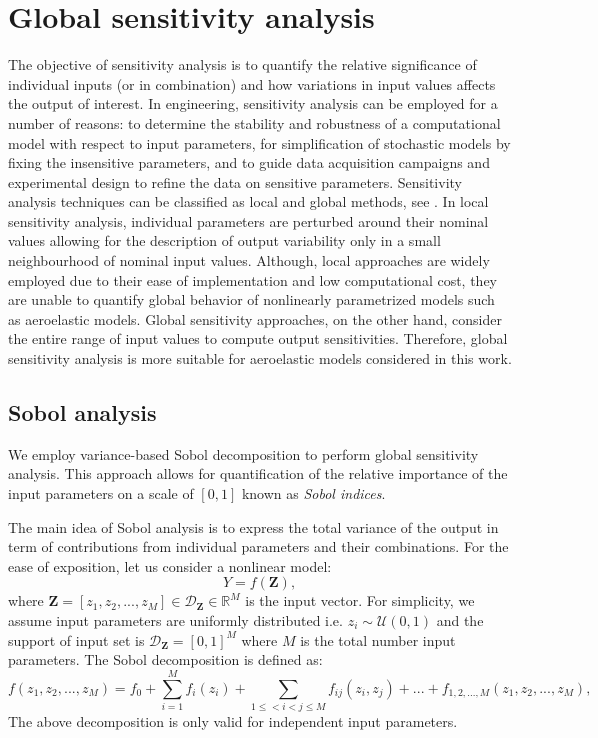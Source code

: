 \documentclass[review]{elsarticle}
\numberwithin{equation}{section}
\numberwithin{equation}{section}
\begin{document}
\section{Global sensitivity analysis}\label{sec:GSA}
The objective of sensitivity analysis is to quantify the relative significance of individual inputs (or in combination) and how variations in input values affects the output of interest. In engineering, sensitivity analysis can be employed for a number of reasons: to determine the stability and robustness of a computational model with respect to input parameters, for simplification of stochastic models by fixing the insensitive parameters, and to guide data acquisition campaigns and experimental design to refine the data on sensitive parameters. Sensitivity analysis techniques can be classified as local and global methods, see \cite{RSmith}. In local sensitivity analysis, individual parameters are perturbed around their nominal values allowing for the description of output variability only in a small neighbourhood of nominal input values. Although, local approaches are widely employed due to their ease of implementation and low computational cost, they are unable to quantify global behavior of nonlinearly parametrized models such as aeroelastic models. Global sensitivity approaches, on the other hand, consider the entire range of input values to compute output sensitivities. Therefore, global sensitivity analysis is more suitable for aeroelastic models considered in this work.  

\subsection{Sobol analysis}
We employ variance-based Sobol decomposition to perform global sensitivity analysis. This approach allows for quantification of  the relative importance of the input parameters on a scale of $[0,1]$ known as \emph{Sobol indices}. 

The main idea of Sobol analysis is to express the total variance of the output in term of contributions from individual parameters and their combinations. For the ease of exposition, let us consider a nonlinear model:
\begin{equation}\label{nonlinear_model}
Y = f(\mathbf{Z}),
\end{equation}
where $\mathbf{Z} = [z_1, z_2, ..., z_M]\in \mathcal{D}_{\mathbf{Z}}\in \mathbb{R}^M$ is the input vector. For simplicity, we assume input parameters are uniformly distributed i.e. $z_i \sim \mathcal{U}(0,1)$ and the support of input set is $\mathcal{D}_\mathbf{Z}  =  [0,1]^M$ where $M$ is the total number input parameters. The Sobol decomposition is defined as:
\begin{equation}\label{sobol_decomp}
f(z_1, z_2, ..., z_M) = f_0+\sum_{i=1}^M f_i(z_i) + \sum_{1\leq<i<j\leq M} f_{ij}(z_i,z_j) + ... + f_{1, 2, ..., M}(z_1, z_2, ..., z_M),
\end{equation}
The above decomposition is only valid for independent input parameters. 
\end{document}
